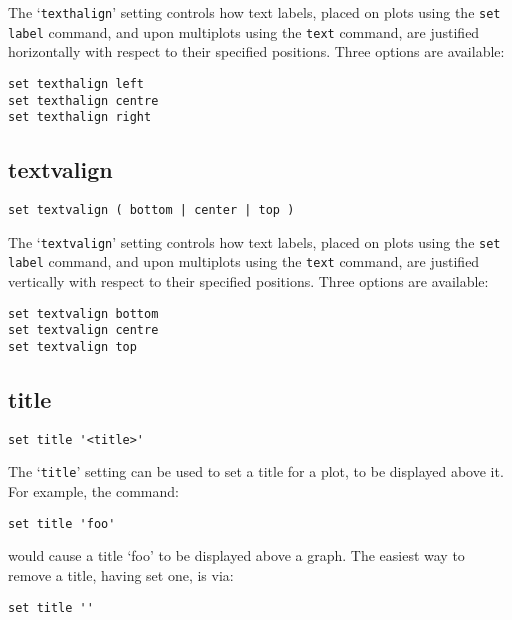 \documentclass[a4paper,onecolumn,11pt]{book}
\begin{document}
The `{\tt texthalign}' setting controls how text labels, placed on plots using the
{\tt set label} command, and upon multiplots using the {\tt text} command, are
justified horizontally with respect to their specified positions. Three options
are available:

\begin{verbatim}
set texthalign left
set texthalign centre
set texthalign right
\end{verbatim}

\subsection{textvalign}

\begin{verbatim}
set textvalign ( bottom | center | top )
\end{verbatim}

The `{\tt textvalign}' setting controls how text labels, placed on plots using the
{\tt set label} command, and upon multiplots using the {\tt text} command, are
justified vertically with respect to their specified positions. Three options
are available:

\begin{verbatim}
set textvalign bottom 
set textvalign centre
set textvalign top
\end{verbatim}

\subsection{title}

\begin{verbatim}
set title '<title>'
\end{verbatim}

The `{\tt title}' setting can be used to set a title for a plot, to be displayed
above it.  For example, the command:

\begin{verbatim}
set title 'foo'
\end{verbatim}

would cause a title `foo' to be displayed above a graph. The easiest way to
remove a title, having set one, is via:

\begin{verbatim}
set title ''
\end{verbatim}
   
\end{document}
